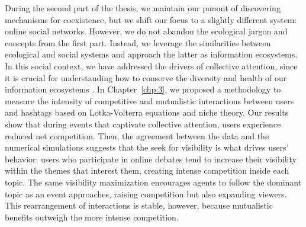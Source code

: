 

During the second part of the thesis, we maintain our pursuit of discovering mechanisms for coexistence, but we shift our focus to a slightly different system: online social networks. However, we do not abandon the ecological jargon and concepts from the first part. Instead, we leverage the similarities between ecological and social systems and approach the latter as information ecosystems. In this social context, 
we have addressed the drivers of collective attention, since it is crucial for understanding how to conserve the diversity and health of our information ecosystems \cite{palazzi2021ecological, gleeson2016effects}. In Chapter~\ref{chp:3},  we proposed a methodology to measure
the intensity of competitive and mutualistic interactions between users and hashtags based on Lotka-Volterra equations and niche theory. Our results show that during events that captivate collective attention, users experience reduced net competition. Then, the agreement between the
data and the numerical simulations suggests that the seek for visibility is what drives users’ behavior: users who participate in online debates tend to increase their visibility within the themes that interest them, creating intense competition inside each topic. The same visibility maximization encourages agents to follow the dominant topic as an event approaches, raising competition but also expanding viewers. This rearrangement of interactions is stable, however, because mutualistic benefits outweigh the more intense competition. \\


